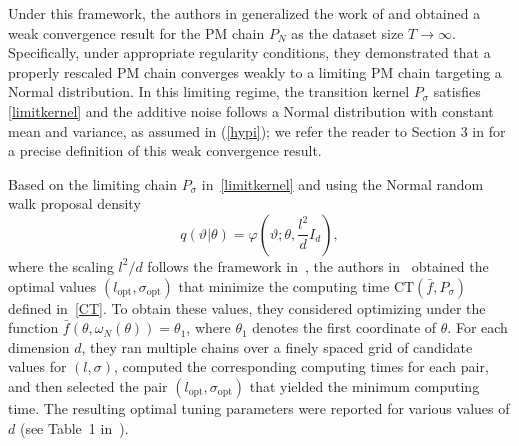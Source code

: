 \documentclass[pdflatex,sn-mathphys-num]{sn-jnl}
\theoremstyle{thmstyleone}
\theoremstyle{thmstyletwo}
\theoremstyle{thmstylethree}
\begin{document}
Under this framework, the authors in \cite{schmon_large-sample_2021} generalized the work of \cite{doucet_efficient_2015, sherlock_efficiency_2015, pitt_properties_2012} and obtained a weak convergence result for the PM chain \(P_N\) as the dataset size \(T \to \infty\). Specifically, under appropriate regularity conditions, they demonstrated that a properly rescaled PM chain converges weakly to a limiting PM chain targeting a Normal distribution. In this limiting regime, the transition kernel $P_\sigma$ satisfies \eqref{limitkernel} and the additive noise follows a Normal distribution with constant mean and variance, as assumed in (\ref{hypi}); we refer the reader to Section 3 in \cite{schmon_large-sample_2021} for a precise definition of this weak convergence result.

Based on the limiting chain $P_\sigma$ in~\eqref{limitkernel} and using the Normal random walk proposal density
\[
q(\vartheta|\theta) = \varphi\left(\vartheta; \theta, \frac{l^2}{d} I_d\right),
\]
where the scaling $l^2/d$ follows the framework in~\cite{sherlock_efficiency_2015}, the authors in~\cite{schmon_large-sample_2021} obtained the optimal values $(l_{\text{opt}}, \sigma_{\text{opt}})$ that minimize the computing time $\mathrm{CT}(\bar f, P_\sigma)$ defined in~\eqref{CT}. To obtain these values, they considered optimizing under the function $\bar f(\theta, \omega_N(\theta)) = \theta_1$, where $\theta_1$ denotes the first coordinate of $\theta$. For each dimension $d$, they ran multiple chains over a finely spaced grid of candidate values for $(l, \sigma)$, computed the corresponding computing times for each pair, and then selected the pair $(l_{\text{opt}}, \sigma_{\text{opt}})$ that yielded the minimum computing time. The resulting optimal tuning parameters were reported for various values of $d$ (see Table~1 in~\cite{schmon_large-sample_2021}).
\end{document}
